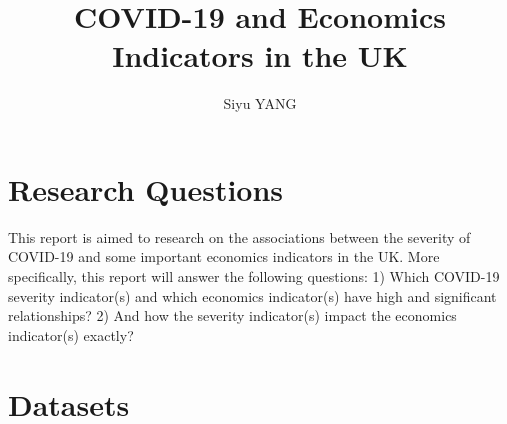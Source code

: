 \documentclass[12pt, a4paper]{report}
\title{COVID-19 and Economics Indicators in the UK}
\author{Siyu YANG}
\date{}
\begin{document}
\maketitle

\section{Research Questions}
This report is aimed to research on the associations between the severity of COVID-19 and some important 
economics indicators in the UK. More specifically, this report will answer the following questions:
1) Which COVID-19 severity indicator(s) and which economics indicator(s) have high and significant relationships?
2) And how the severity indicator(s) impact the economics indicator(s) exactly?


\section{Datasets}
\end{document}
